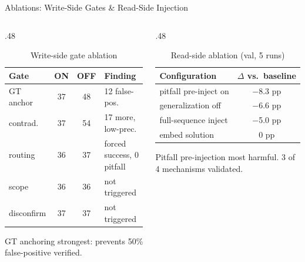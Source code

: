 \documentclass{beamer}
\begin{document}
\begin{frame}{Ablations: Write-Side Gates \& Read-Side Injection}
    \begin{columns}
        \begin{column}{.48\textwidth}
            \begin{table}[h]
                \centering
                \caption{Write-side gate ablation}
                \tiny
                \begin{tabular}{lccl}
                    \toprule
                    Gate & ON & OFF & Finding \\
                    \midrule
                    GT anchor & 37 & 48 & 12 false-pos. \\
                    contrad. & 37 & 54 & 17 more, low-prec. \\
                    routing & 36 & 37 & forced success, 0 pitfall \\
                    scope & 36 & 36 & not triggered \\
                    disconfirm & 37 & 37 & not triggered \\
                    \bottomrule
                \end{tabular}
            \end{table}
            \scriptsize GT anchoring strongest: prevents 50\% false-positive verified.
        \end{column}
        \begin{column}{.48\textwidth}
            \begin{table}[h]
                \centering
                \caption{Read-side ablation (val, 5 runs)}
                \scriptsize
                \begin{tabular}{lc}
                    \toprule
                    Configuration & $\Delta$ vs.\ baseline \\
                    \midrule
                    pitfall pre-inject on & $-$8.3 pp \\
                    generalization off & $-$6.6 pp \\
                    full-sequence inject & $-$5.0 pp \\
                    embed solution & 0 pp \\
                    \bottomrule
                \end{tabular}
            \end{table}
            \scriptsize Pitfall pre-injection most harmful. 3 of 4 mechanisms validated.
        \end{column}
    \end{columns}
\end{frame}
\end{document}
